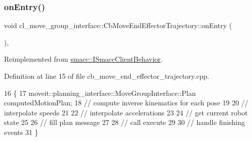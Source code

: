 \mbox{\label{classcl__move__group__interface_1_1CbMoveEndEffectorTrajectory_aaedd074fd178c6390a4a3f1ccff23ad3}} 
\subsubsection{\texorpdfstring{on\+Entry()}{onEntry()}}
{\footnotesize\ttfamily void cl\+\_\+move\+\_\+group\+\_\+interface\+::\+Cb\+Move\+End\+Effector\+Trajectory\+::on\+Entry (\begin{DoxyParamCaption}{ }\end{DoxyParamCaption})\hspace{0.3cm}{\ttfamily [override]}, {\ttfamily [virtual]}}



Reimplemented from \hyperlink{classsmacc_1_1ISmaccClientBehavior_a3ec24a839087c550e1d62a81e48cf530}{smacc\+::\+I\+Smacc\+Client\+Behavior}.



Definition at line 15 of file cb\+\_\+move\+\_\+end\+\_\+effector\+\_\+trajectory.\+cpp.


\begin{DoxyCode}
16     \{
17         moveit::planning\_interface::MoveGroupInterface::Plan computedMotionPlan;
18         \textcolor{comment}{// compute inverse kinematics for each pose}
19 
20         \textcolor{comment}{// interpolate speeds}
21 
22         \textcolor{comment}{// interpolate accelerations}
23 
24         \textcolor{comment}{// get current robot state}
25 
26         \textcolor{comment}{// fill plan message}
27 
28         \textcolor{comment}{// call execute}
29 
30         \textcolor{comment}{// handle finishing events}
31     \}
\end{DoxyCode}
\mbox{\label{classcl__move__group__interface_1_1CbMoveEndEffectorTrajectory_a8490f52e1f8cb280657965b544bfed30}} 
